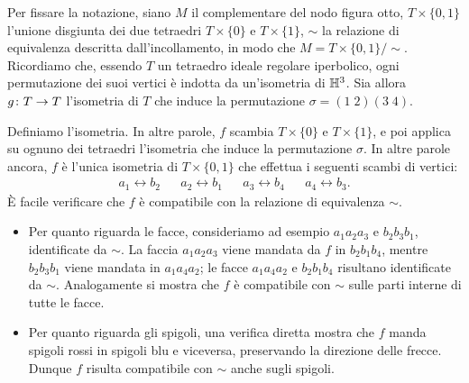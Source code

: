 Per fissare la notazione, siano $M$ il complementare del nodo figura otto, $T\times\{0,1\}$ l'unione disgiunta dei due tetraedri $T\times\{0\}$ e $T\times\{1\}$, $\sim$ la relazione di equivalenza descritta dall'incollamento, in modo che $M=T\times\{0,1\}/\sim$. Ricordiamo che, essendo $T$ un tetraedro ideale regolare iperbolico, ogni permutazione dei suoi vertici è indotta da un'isometria di $\mathbb{H}^3$. Sia allora $\map{g}{T}{T}$ l'isometria di $T$ che induce la permutazione $\sigma=(1\;2)(3\;4)$.
\begin{center}
\end{center}
Definiamo l'isometria.
In altre parole, $f$ scambia $T\times\{0\}$ e $T\times\{1\}$, e poi applica su ognuno dei tetraedri l'isometria che induce la permutazione $\sigma$. In altre parole ancora, $f$ è l'unica isometria di $T\times\{0,1\}$ che effettua i seguenti scambi di vertici:
\begin{align*}
a_1\leftrightarrow b_2&&a_2\leftrightarrow b_1&&a_3\leftrightarrow b_4&&a_4\leftrightarrow b_3.
\end{align*}
È facile verificare che $f$ è compatibile con la relazione di equivalenza $\sim$.
\begin{itemize}
\item Per quanto riguarda le facce, consideriamo ad esempio $a_1a_2a_3$ e $b_2b_3b_1$, identificate da $\sim$. La faccia $a_1a_2a_3$ viene mandata da $f$ in $b_2b_1b_4$, mentre $b_2b_3b_1$ viene mandata in $a_1a_4a_2$; le facce $a_1a_4a_2$ e $b_2b_1b_4$ risultano identificate da $\sim$. Analogamente si mostra che $f$ è compatibile con $\sim$ sulle parti interne di tutte le facce.
\item Per quanto riguarda gli spigoli, una verifica diretta mostra che $f$ manda spigoli rossi in spigoli blu e viceversa, preservando la direzione delle frecce. Dunque $f$ risulta compatibile con $\sim$ anche sugli spigoli.
\end{itemize}
